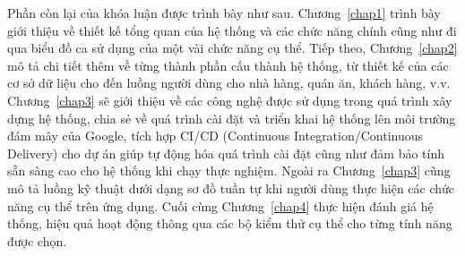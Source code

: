 Phần còn lại của khóa luận được trình bày như sau.
Chương~\ref{chap1} trình bày giới thiệu về thiết kế tổng quan của hệ thống và các chức năng chính cũng như đi qua biểu đồ ca sử dụng của một vài chức năng cụ thể.
Tiếp theo, Chương~\ref{chap2} mô tả chi tiết thêm về từng thành phần cấu thành hệ thống, từ thiết kế của các cơ sở dữ liệu cho đến luồng người dùng cho nhà hàng, quán ăn, khách hàng, v.v.
Chương~\ref{chap3} sẽ giới thiệu về các công nghệ được sử dụng trong quá trình xây dựng hệ thống, chia sẻ về quá trình cài đặt và triển khai hệ thống lên môi trường đám mây của Google, tích hợp CI/CD (Continuous Integration/Continuous Delivery) cho dự án giúp tự động hóa quá trình cài đặt cũng như đảm bảo tính sẵn sàng cao cho hệ thống khi chạy thực nghiệm.
Ngoài ra Chương~\ref{chap3} cũng mô tả luồng kỹ thuật dưới dạng sơ đồ tuần tự khi người dùng thực hiện các chức năng cụ thể trên ứng dụng.
Cuối cùng Chương~\ref{chap4} thực hiện đánh giá hệ thống, hiệu quả hoạt động thông qua các bộ kiểm thử cụ thể cho từng tính năng được chọn.